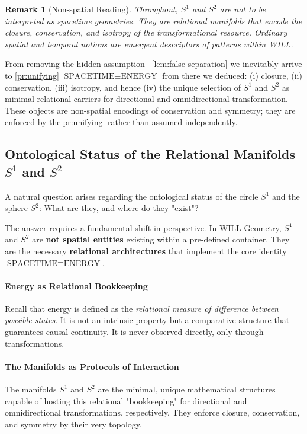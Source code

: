 \documentclass[12pt, a4paper]{article}
\newtheorem{remark}[theorem]{Remark}
\begin{document}
\begin{remark}[Non-spatial Reading]
\label{rem:nonspatial}
Throughout, \(S^1\) and \(S^2\) are not to be interpreted as \emph{spacetime} geometries. They are \emph{relational manifolds} that encode the closure, conservation, and isotropy of the transformational resource. Ordinary spatial and temporal notions are emergent descriptors of patterns within WILL.
\end{remark}

\begin{tcolorbox}[colback=gray!5, colframe=black!80!black, title=Summary:]
From removing the hidden assumption ~\ref{lem:false-separation} we inevitably arrive to \ref{pr:unifying}   \(\text{SPACETIME}\equiv\text{ENERGY}\) from there we deduced: (i) closure, (ii) conservation, (iii) isotropy, and hence (iv) the unique selection of \(S^1\) and \(S^2\) as minimal relational carriers for directional and omnidirectional transformation. These objects are non-spatial encodings of conservation and symmetry; they are enforced by the\ref{pr:unifying} rather than assumed independently.
\end{tcolorbox}

\subsection{Ontological Status of the Relational Manifolds \(S^1\) and \(S^2\)}

A natural question arises regarding the ontological status of the circle \(S^1\) and the sphere \(S^2\): What are they, and where do they "exist"?

The answer requires a fundamental shift in perspective. In WILL Geometry, \(S^1\) and \(S^2\) are \textbf{not spatial entities} existing within a pre-defined container. They are the necessary \textbf{relational architectures} that implement the core identity \(\text{SPACETIME} \equiv \text{ENERGY}\).

\paragraph{Energy as Relational Bookkeeping}
Recall that energy is defined as the \textit{relational measure of difference between possible states}. It is not an intrinsic property but a comparative structure that guarantees causal continuity. It is never observed directly, only through transformations.

\paragraph{The Manifolds as Protocols of Interaction}
The manifolds \(S^1\) and \(S^2\) are the minimal, unique mathematical structures capable of hosting this relational "bookkeeping" for directional and omnidirectional transformations, respectively. They enforce closure, conservation, and symmetry by their very topology.
\end{document}

